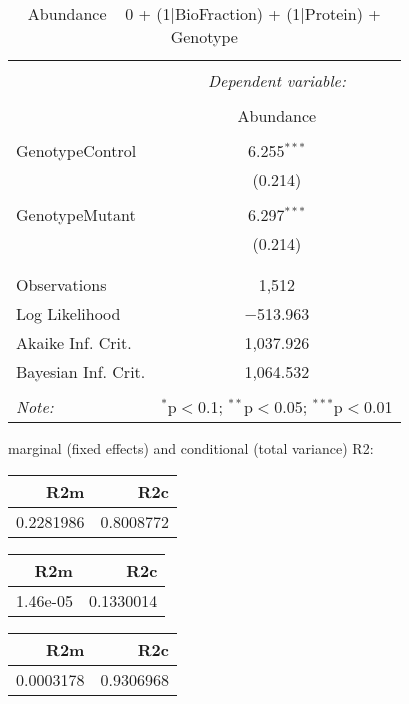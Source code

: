 \documentclass[11pt]{report}
\begin{document}
\begin{table}[!htbp] \centering 
  \caption{Abundance ~ 0 + (1|BioFraction) + (1|Protein) + Genotype} 
  \label{} 
\begin{tabular}{@{\extracolsep{5pt}}lc} 
\\[-1.8ex]\hline 
\hline \\[-1.8ex] 
 & \multicolumn{1}{c}{\textit{Dependent variable:}} \\ 
\cline{2-2} 
\\[-1.8ex] & Abundance \\ 
\hline \\[-1.8ex] 
 GenotypeControl & 6.255$^{***}$ \\ 
  & (0.214) \\ 
  & \\ 
 GenotypeMutant & 6.297$^{***}$ \\ 
  & (0.214) \\ 
  & \\ 
\hline \\[-1.8ex] 
Observations & 1,512 \\ 
Log Likelihood & $-$513.963 \\ 
Akaike Inf. Crit. & 1,037.926 \\ 
Bayesian Inf. Crit. & 1,064.532 \\ 
\hline 
\hline \\[-1.8ex] 
\textit{Note:}  & \multicolumn{1}{r}{$^{*}$p$<$0.1; $^{**}$p$<$0.05; $^{***}$p$<$0.01} \\ 
\end{tabular} 
\end{table} 
marginal (fixed effects) and conditional (total variance) R2:

\begin{tabular}{r|r}
\hline
R2m & R2c\\
\hline
0.2281986 & 0.8008772\\
\hline
\end{tabular}

\begin{tabular}{r|r}
\hline
R2m & R2c\\
\hline
1.46e-05 & 0.1330014\\
\hline
\end{tabular}

\begin{tabular}{r|r}
\hline
R2m & R2c\\
\hline
0.0003178 & 0.9306968\\
\hline
\end{tabular}
\end{document}
